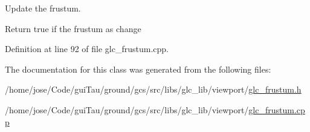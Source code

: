 Update the frustum. 

Return true if the frustum as change 

Definition at line 92 of file glc\-\_\-frustum.\-cpp.



The documentation for this class was generated from the following files\-:\begin{DoxyCompactItemize}
\item 
/home/jose/\-Code/gui\-Tau/ground/gcs/src/libs/glc\-\_\-lib/viewport/\hyperlink{glc__frustum_8h}{glc\-\_\-frustum.\-h}\item 
/home/jose/\-Code/gui\-Tau/ground/gcs/src/libs/glc\-\_\-lib/viewport/\hyperlink{glc__frustum_8cpp}{glc\-\_\-frustum.\-cpp}\end{DoxyCompactItemize}
